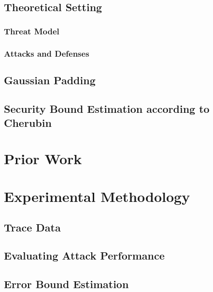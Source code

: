 \documentclass[
	ruledheaders=chapter,
	class=report,
	thesis={type=master, department=inf},
	accentcolor=1c,
	custommargins=true,
	marginpar=false,
	parskip=half-,
	fontsize=11pt,
]{tudapub}
\begin{document}
	\section{Theoretical Setting}
	\label{theoretical}
	
	\subsection{Threat Model}
	\label{theoretical:threat_model}
	
	\subsection{Attacks and Defenses}
	\label{theoretical:attacks_and_defenses}
	
	\section{Gaussian Padding}
	\label{gaussian_padding}
	
	\section{Security Bound Estimation according to Cherubin \cite{Cherubin2017}}
	\label{cherubin_bounds}

	\chapter{Prior Work}
	\label{related}

	\chapter{Experimental Methodology}
	\label{methods}

	\section{Trace Data}
	\label{dataset_quality}

	\section{Evaluating Attack Performance}
	\label{pipeline}

	\section{Error Bound Estimation}
	\label{error_bound_estimation}
\end{document}
